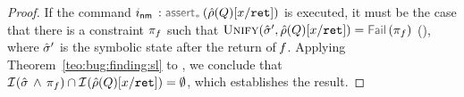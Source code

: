 \begin{proof}
\noindent {} If the command $\retlab \, : \sepassert(\sstore(Q)[\jvar/\retvar])$ is executed, 
it must be the case that there is a constraint $\pi_f$ such that 
$\unificationfun(\sstate', \sstore(Q)[\jvar/\retvar]) = \fail{\pc_f}$ (), where $\hat{\sigma}'$ is the symbolic 
state after the return of $\mathit{f}$. 
Applying Theorem~\ref{teo:bug:finding:sl} to , we conclude that 
$\mathcal{I}^{}_{}(\hat{\sigma} \, \wedge \, \pi_f) \cap \mathcal{I}^{}_{}(\hat\rho(Q)[x/\mathtt{ret}]) = \emptyset$, 
which establishes the result.
 \end{proof}
 
 

 
%


